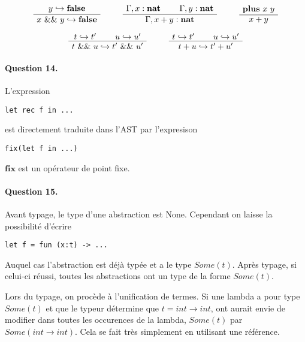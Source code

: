 \documentclass[12pt]{article}
\newenvironment{bprooftree}
  {\leavevmode\hbox\bgroup}
  {\DisplayProof\egroup}
\begin{document}
\[
\begin{bprooftree}
\AxiomC{$y \hookrightarrow \textbf{false}$}
\UnaryInfC{$x\ \&\& \ y \hookrightarrow \textbf{false}$}
\end{bprooftree} \qquad
\begin{bprooftree}
\AxiomC{$\Gamma, x : \textbf{nat}$}
\AxiomC{$\Gamma, y : \textbf{nat}$}
\BinaryInfC{$\Gamma, x + y : \textbf{nat}$}
\end{bprooftree} \qquad
\begin{bprooftree}
\AxiomC{$\textbf{plus}\ x \ y$}
\UnaryInfC{$x + y$}
\end{bprooftree}
\]

\[
\begin{bprooftree}
\AxiomC{$t \hookrightarrow t^{\prime}$}
\AxiomC{$u \hookrightarrow u^{\prime}$}
\BinaryInfC{$t \ \&\& \ u \hookrightarrow t^{\prime} \ \&\& \ u^{\prime}$}
\end{bprooftree} \qquad
\begin{bprooftree}
\AxiomC{$t \hookrightarrow t^{\prime}$}
\AxiomC{$u \hookrightarrow u^{\prime}$}
\BinaryInfC{$t + u \hookrightarrow t^{\prime} + u^{\prime}$}
\end{bprooftree}
\]

\paragraph{Question 14.}

L'expression 
\begin{verbatim}
let rec f in ...
\end{verbatim} 
est directement traduite dans l'AST par l'expresison 
\begin{verbatim}
fix(let f in ...)
\end{verbatim}
$\textbf{fix}$ est un opérateur de point fixe.


\paragraph{Question 15.}

Avant typage, le type d'une abstraction est None. Cependant on laisse la possibilité d'écrire
\begin{verbatim}
let f = fun (x:t) -> ...
\end{verbatim}
Auquel cas l'abstraction est déjà typée et a le type $Some(t)$.
Après typage, si celui-ci réussi, toutes les abstractions ont un type de la forme $Some(t)$.

Lors du typage, on procède à l'unification de termes. Si une lambda a pour type $Some(t)$ et que le typeur détermine que $t = int \rightarrow int$, ont aurait envie de modifier dans toutes les occurences de la lambda, $Some(t)$ par $Some(int \rightarrow int)$. Cela se fait très simplement en utilisant une référence.
\end{document}
